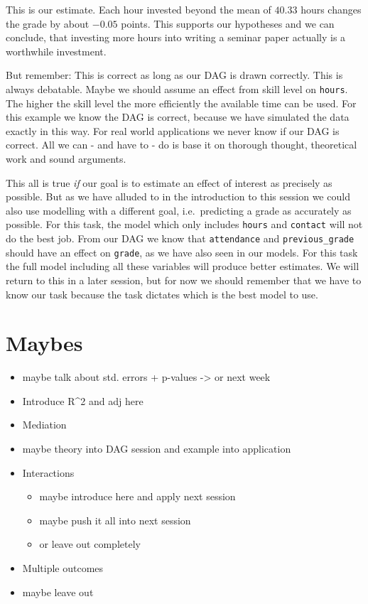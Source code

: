 \documentclass[
]{book}
\providecommand{\tightlist}{%
  \setlength{\itemsep}{0pt}\setlength{\parskip}{0pt}}
\begin{document}
This is our estimate. Each hour invested beyond the mean of \(40.33\) hours
changes the grade by about \(-0.05\) points. This supports our hypotheses and we
can conclude, that investing more hours into writing a seminar paper actually
is a worthwhile investment.

But remember: This is correct as long as our DAG is drawn correctly. This is
always debatable. Maybe we should assume an effect from skill level on \texttt{hours}.
The higher the skill level the more efficiently the available time can be used.
For this example we know the DAG is correct, because we have simulated the data
exactly in this way. For real world applications we never know if our DAG is
correct. All we can - and have to - do is base it on thorough thought,
theoretical work and sound arguments.

This all is true \emph{if} our goal is to estimate an effect of interest as precisely
as possible. But as we have alluded to in the introduction to this session we
could also use modelling with a different goal, i.e.~predicting a grade as
accurately as possible. For this task, the model which only includes \texttt{hours} and
\texttt{contact} will not do the best job. From our DAG we know that \texttt{attendance} and
\texttt{previous\_grade} should have an effect on \texttt{grade}, as we have also seen in our
models. For this task the full model including all these variables will produce
better estimates. We will return to this in a later session, but for now we
should remember that we have to know our task because the task dictates which is
the best model to use.

\hypertarget{maybes}{%
\section{Maybes}\label{maybes}}

\begin{itemize}
\item
  maybe talk about std. errors + p-values -\textgreater{} or next week
\item
  Introduce R\^{}2 and adj here
\item
  Mediation
\item
  maybe theory into DAG session and example into application
\item
  Interactions

  \begin{itemize}
  \tightlist
  \item
    maybe introduce here and apply next session
  \item
    maybe push it all into next session
  \item
    or leave out completely
  \end{itemize}
\item
  Multiple outcomes
\item
  maybe leave out
\end{itemize}
\end{document}
